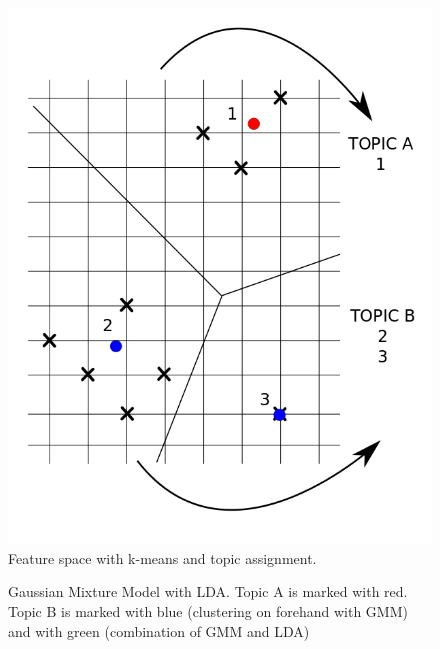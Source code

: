 \begin{figure}[h!]
\begin{minipage}[b]{0.3\linewidth}
\includegraphics[width=\textwidth]{Pictures/kMeans.png}
\caption{Feature space with k-means and topic assignment.}
\label{fig:FSk-means}
\end{minipage}
\end{figure}

\begin{figure}[h]
\centering
\def\svgwidth{140pt}

\caption{Gaussian Mixture Model with LDA. Topic A is marked with red. Topic B is marked with blue (clustering on forehand with GMM) and with green (combination of GMM and LDA)}
\label{fig:GMM+LDA}
\end{figure}

